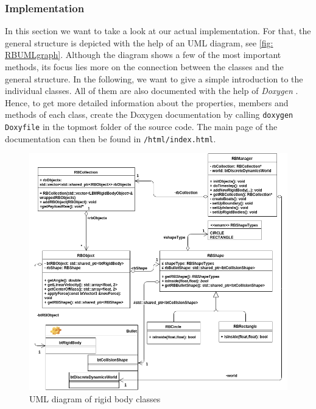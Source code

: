 \subsubsection{Implementation}
In this section we want to take a look at our actual implementation. For that, the general structure is depicted with the help of an UML diagram, see \autoref{fig: RBUMLgraph}. Although the diagram shows a few of the most important methods, its focus lies more on the connection between the classes and the general structure. In the following, we want to give a simple introduction to the individual classes. All of them are also documented with the help of \emph{Doxygen} \cite{Doxygen}. Hence, to get more detailed information about the properties, members and methods of each class, create the Doxygen documentation by calling \texttt{doxygen Doxyfile} in the topmost folder of the source code. The main page of the documentation can then be found in \texttt{/html/index.html}.
\begin{figure}[ht]
\centering
\includegraphics[scale=0.42]{img/RigidBodies/RigidBodyUML.png}
\caption{UML diagram of rigid body classes}
\label{fig: RBUMLgraph}
\end{figure}

